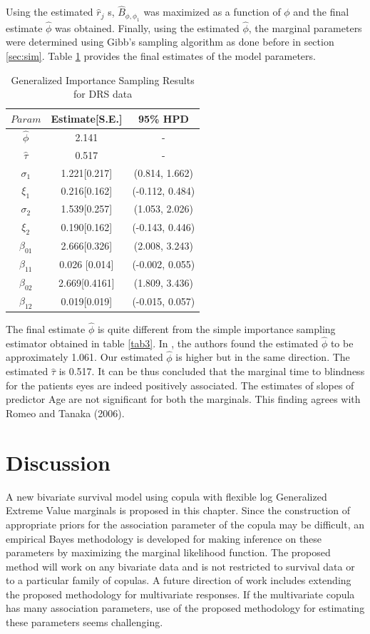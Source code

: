 \documentclass[11pt]{article}
\theoremstyle{remboldstyle}
\begin{document}
\noindent
Using the estimated $\hat{r}_j$ s, $\hat{B}_{\phi, \phi_1}$ was maximized as a function of $\phi$ and the final estimate $\hat{\phi}$ was obtained. Finally, using the estimated $\hat{\phi}$, the marginal parameters were determined using Gibb's sampling algorithm as done before in section \ref{sec:sim}. Table \ref{tab5} provides the final estimates of the model parameters. 
\begin{table}[h]
\caption{Generalized Importance Sampling Results for DRS data}
\centering
\begin{tabular}{c c c}
\hline
$Param$      & Estimate[S.E.] & 95\% HPD\\
\hline
$\hat{\phi}$ & 2.141              & -\\
$\hat{\tau}$ & 0.517              & -\\
$\sigma_1$      & 1.221[0.217]        & (0.814, 1.662)\\   
$\xi_1$      & 0.216[0.162]        & (-0.112, 0.484)\\
$\sigma_2$ & 1.539[0.257]              & (1.053, 2.026)\\
$\xi_2$      & 0.190[0.162]        & (-0.143, 0.446)\\   
$\beta_{01}$      & 2.666[0.326]        & (2.008, 3.243)\\
$\beta_{11}$ & 0.026 [0.014]             & (-0.002, 0.055)\\
$\beta_{02}$      & 2.669[0.4161]        & (1.809, 3.436)\\   
$\beta_{12}$      & 0.019[0.019]        & (-0.015, 0.057)\\
 \hline             
\end{tabular}
\label{tab5}
\end{table}
\noindent
The final estimate $\hat{\phi}$ is quite different from the simple importance sampling estimator obtained in table \ref{tab3}. In \cite{romeo:tanaka:2006}, the authors found the estimated $\hat{\phi}$ to be approximately 1.061. Our estimated $\hat{\phi}$ is higher but in the same direction. The estimated $\hat{\tau}$ is 0.517. It can be thus concluded that the marginal time to blindness for the patients eyes are indeed positively associated. The estimates of slopes of predictor Age are not significant for both the marginals. This finding agrees with Romeo and Tanaka (2006). 
\section{Discussion}
\label{sec:dis}
\noindent
A new bivariate survival model using copula with flexible log Generalized Extreme Value marginals is proposed in this chapter. Since the construction of appropriate priors for the association parameter of the copula may be difficult, an empirical Bayes methodology is developed for making inference on these parameters by maximizing the marginal likelihood function. The proposed method will work on any bivariate data and is not restricted to survival data or to a particular family of copulas. A future direction of work includes extending the proposed methodology for multivariate responses. If the multivariate copula has many association parameters, use of the proposed methodology for estimating these parameters seems challenging. 



\end{document}
